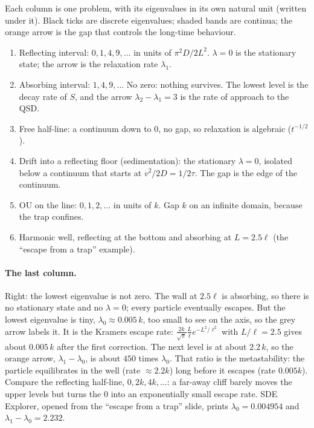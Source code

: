 \documentclass[11pt]{article}
\begin{document}
Each column is one problem, with its eigenvalues in its own natural unit (written under it). Black ticks are discrete
eigenvalues; shaded bands are continua; the orange arrow is the gap that controls the long-time behaviour.
\begin{enumerate}
  \item Reflecting interval: $0,1,4,9,\dots$ in units of $\pi^2D/2L^2$. $\lambda=0$ is the stationary state; the arrow is
        the relaxation rate $\lambda_1$.
  \item Absorbing interval: $1,4,9,\dots$ No zero: nothing survives. The lowest level is the decay rate of $S$, and the
        arrow $\lambda_2-\lambda_1=3$ is the rate of approach to the QSD.
  \item Free half-line: a continuum down to $0$, no gap, so relaxation is algebraic ($t^{-1/2}$).
  \item Drift into a reflecting floor (sedimentation): the stationary $\lambda=0$, isolated below a continuum that
        starts at $v^2/2D=1/2\tau$. The gap is the edge of the continuum.
  \item OU on the line: $0,1,2,\dots$ in units of $k$. Gap $k$ on an infinite domain, because the trap confines.
  \item Harmonic well, reflecting at the bottom and absorbing at $L=2.5\ell$ (the ``escape from a trap'' example).
\end{enumerate}
\paragraph{The last column.} Right: the lowest eigenvalue is not zero. The wall at $2.5\ell$ is absorbing, so there is
no stationary state and no $\lambda=0$; every particle eventually escapes. But the lowest eigenvalue is tiny,
$\lambda_0\approx0.005\,k$, too small to see on the axis, so the grey arrow labels it. It is the Kramers escape rate:
$\frac{2k}{\sqrt\pi}\frac L\ell e^{-L^2/\ell^2}$ with $L/\ell=2.5$ gives about $0.005\,k$ after the first correction.
The next level is at about $2.2\,k$, so the orange arrow, $\lambda_1-\lambda_0$, is about $450$ times $\lambda_0$. That ratio is
the metastability: the particle equilibrates in the well (rate $\approx2.2k$) long before it escapes (rate
$0.005k$). Compare the reflecting half-line, $0,2k,4k,\dots$: a far-away cliff barely moves the upper levels but turns
the $0$ into an exponentially small escape rate. SDE Explorer, opened from the ``escape from a trap'' slide, prints
$\lambda_0=0.004954$ and $\lambda_1-\lambda_0=2.232$.
\end{document}
